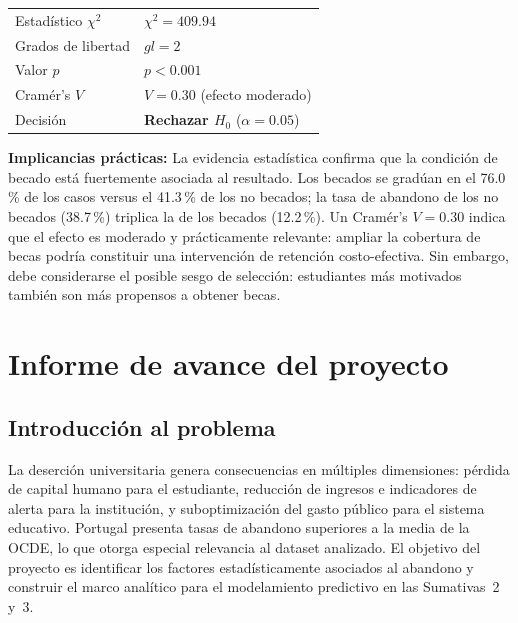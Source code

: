 \documentclass[11pt,a4paper]{article}
\begin{document}
\begin{resultbox}
\begin{tabular}{ll}
Estadístico $\chi^2$   & $\chi^2 = 409.94$ \\
Grados de libertad     & $gl = 2$ \\
Valor $p$              & $p < 0.001$ \\
Cramér's $V$           & $V = 0.30$ (efecto moderado) \\
Decisión               & \textbf{Rechazar $H_0$} ($\alpha = 0.05$) \\
\end{tabular}
\end{resultbox}

\textbf{Implicancias prácticas:} La evidencia estadística confirma que la condición de becado está fuertemente asociada al resultado. Los becados se gradúan en el 76.0\,\% de los casos versus el 41.3\,\% de los no becados; la tasa de abandono de los no becados (38.7\,\%) triplica la de los becados (12.2\,\%). Un Cramér's $V=0.30$ indica que el efecto es moderado y prácticamente relevante: ampliar la cobertura de becas podría constituir una intervención de retención costo-efectiva. Sin embargo, debe considerarse el posible sesgo de selección: estudiantes más motivados también son más propensos a obtener becas.


\section{Informe de avance del proyecto}

\subsection{Introducción al problema}

La deserción universitaria genera consecuencias en múltiples dimensiones:
pérdida de capital humano para el estudiante, reducción de ingresos e
indicadores de alerta para la institución, y suboptimización del gasto
público para el sistema educativo. Portugal presenta tasas de abandono
superiores a la media de la OCDE, lo que otorga especial relevancia al
dataset analizado. El objetivo del proyecto es identificar los factores
estadísticamente asociados al abandono y construir el marco analítico para
el modelamiento predictivo en las Sumativas~2 y~3.
\end{document}
